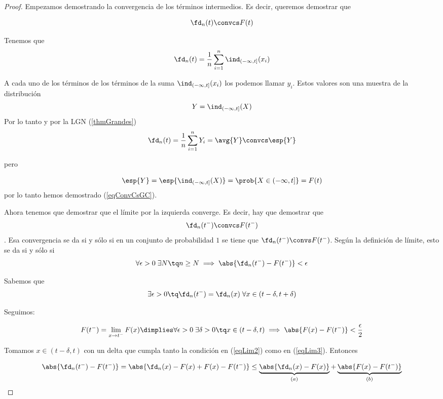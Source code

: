 \documentclass{apuntes}
\begin{document}
\begin{proof}
Empezamos demostrando la convergencia de los términos intermedios. Es decir, queremos demostrar que

\begin{equation}\label{eqConvCsGC}
\fd_n(t) \convcs F(t)
\end{equation}

Tenemos que \[ \fd_n(t) = \frac{1}{n}\sum_{i=1}^n \ind_{(-\infty, t]} (x_i) \]

A cada uno de los términos de los términos de la suma $\ind_{(-\infty, t]}(x_i)$ los podemos llamar $y_i$. Estos valores son una muestra de la distribución \[ Y = \ind_{(-\infty, t]}(X) \]
Por lo tanto y por la LGN (\ref{thmGrandes}) \[ \fd_n(t) = \frac{1}{n}\sum_{i=1}^n Y_i = \avg{Y} \convcs \esp{Y} \]

pero

\[ \esp{Y} = \esp{\ind_{(-\infty, t]}(X)} = \prob{X\in (-\infty, t]} = F(t) \] por lo tanto hemos demostrado (\ref{eqConvCsGC}).

Ahora tenemos que demostrar que el límite por la izquierda converge. Es decir, hay que demostrar que \begin{equation}
 \fd_n(t^-) \convcs F(t^-)  \label{eqConvIzq}
\end{equation}. Esa convergencia se da si y sólo si en un conjunto de probabilidad $1$ se tiene que $ \fd_n(t^-) \convs F(t^-) $. Según la definición de límite, esto se da si y sólo si \begin{equation}
 \forall \epsilon > 0\; \exists N \tq n \geq N \implies \abs{\fd_n(t^-) - F(t^-) } < \epsilon \label{eqLim1} \end{equation}

Sabemos que
\begin{equation}
	\exists\epsilon >0\tq \fd_n (t^-) = \fd_n (x)\; \forall x \in (t-\delta, t+\delta) \label{eqLim2}
\end{equation}

Seguimos:

\begin{equation}
 F(t^-) = \lim_{x\to t^-} F(x) \dimplies \forall \epsilon > 0 \; \exists \delta > 0 \tq x \in (t - \delta, t) \implies \abs{F(x) - F(t^-)} < \frac{\epsilon}{2}\label{eqLim3}
\end{equation}

Tomamos $x\in(t-\delta, t)$ con un delta que cumpla tanto la condición en (\ref{eqLim2}) como en (\ref{eqLim3}). Entonces

\[ \abs{\fd_n(t^-) - F(t^-)} =  \abs{\fd_n(x) - F(x) + F(x) - F(t^-)} \leq \underbrace{\abs{\fd_n(x) - F(x)}}_{(a)} + \underbrace{\abs{F(x) - F(t^-)}}_{(b)} \]


\end{proof}
\end{document}
